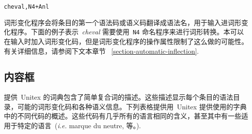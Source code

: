 \begin{verbatim}
cheval,N4+Anl
\end{verbatim}

\noindent 
词形变化程序会将条目的第一个语法码或语义码翻译成语法名，用于输入进词形变化程序。下面的例子表示\ \textit{cheval} 需要使用\ \verb+N4+ 命名程序来进行词形转换。本可以在输入时加入词形变化码，但是词形变化程序的操作属性限制了这么做的可能性。有关详细信息，请参阅下文本章节 ~\ref{section-automatic-inflection}.


\subsection{内容框}

提供\ Unitex 的词典包含了简单复合词的描述。这些描述显示每个条目的语法目录，可能的词形变化码和各种语义信息。下列表格提供用\ Unitex 提供使用的字典中的不同代码的概述。这些代码有几乎所有的语言相同的含义，甚至其中有一些适用于特定的语言\  (\textit{i.e.} marque du neutre, 等。).

